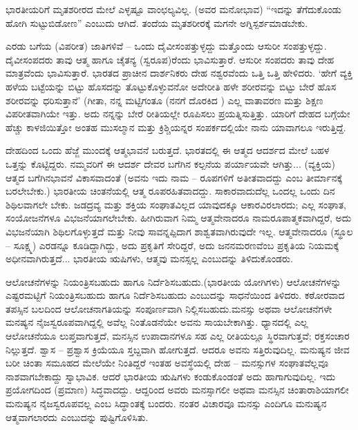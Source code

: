 ಭಾರತೀಯರಿಗೆ ಮೃತಶರೀರದ ಮೇಲೆ ಎಳ್ಳಷ್ಟೂ ವಾಂಛಲ್ಯವಿಲ್ಲ. (ಅವರ ಮನೋಭಾವ) “ಇದನ್ನು ತೆಗೆದುಕೊಂಡು ಹೋಗಿ ಸುಟ್ಟುಬಿಡೋಣ'' ಎಂಬುದು ಆಗಿದೆ. ತಂದೆಯ ಮೃತಶರೀರಕ್ಕೆ ಮಗನೇ ಅಗ್ನಿಸ್ಪರ್ಶಮಾಡಬೇಕು.

ಎರಡು ಬಗೆಯ (ವಿಪರೀತ) ಜಾತಿಗಳಿವೆ – ಒಂದು ದೈವೀಸಂಪತ್ತುಳ್ಳದ್ದು ಮತ್ತೊಂದು ಆಸುರೀ ಸಂಪತ್ತುಳ್ಳದ್ದು. ದೈವೀಸಂಪದರು ತಾವು ಆತ್ಮ ಹಾಗೂ ಚೈತನ್ಯ (ಸ್ವರೂಪ)ರೆಂದು ಭಾವಿಸುತ್ತಾರೆ. ಆಸುರೀ ಸಂಪದರು ತಾವು ದೇಹ ಮಾತ್ರವೆಂದು ಭಾವಿಸುತ್ತಾರೆ. ಭಾರತದ ಪ್ರಾಚೀನ ದಾರ್ಶನಿಕರು ದೇಹ ನಶ್ವರವೆಂದು ಒತ್ತಿ ಒತ್ತಿ ಹೇಳಿದರು. `ಹೇಗೆ ವ್ಯಕ್ತಿ ಹಳೆಯ ಬಟ್ಟೆಯನ್ನು ಬಿಟ್ಟು ಹೊಸದನ್ನು ತೊಟ್ಟುಕೊಳ್ಳುವನೋ ಅದೇರೀತಿ ಹಳೇ ಶರೀರವನ್ನು ಬಿಟ್ಟು ಬೇರೆ ಹೊಸ ಶರೀರವನ್ನು ಧರಿಸುತ್ತಾನೆ' (ಗೀತಾ,  ನನ್ನ ಮಟ್ಟಿಗಂತೂ (ನನಗೆ ದೊರಕಿದ ) ಎಲ್ಲ ವಾತಾವರಣ ಮತ್ತು ಶಿಕ್ಷಣ ವಿಪರೀತವಾಗಿಯೇ ಇತ್ತು. ಅದು ನನ್ನನ್ನು ಬೇರೆ ರೀತಿಯಲ್ಲೇ ರೂಪಿಸಲು ಪ್ರಯತ್ನಿಸುತ್ತಿತ್ತು. ಯಾರಿಗೆ ದೇಹದ ಬಗ್ಗೆಯೇ ಹೆಚ್ಚು ಕಾಳಜಿಯಿತ್ತೋ ಅಂತಹ ಮುಸಲ್ಮಾನ ಮತ್ತು ಕ್ರಿಶ್ಚಿಯನ್ನರ ಸಂಪರ್ಕದಲ್ಲಿಯೇ ನಾನು ಯಾವಾಗಲೂ ಇರುತ್ತಿದ್ದೆ.

ದೇಹದಿಂದ ಒಂದು ಹೆಜ್ಜೆ ಮುಂದಕ್ಕೆ ಆತ್ಮಭಾವನೆ ಬರುತ್ತದೆ. ಭಾರತದಲ್ಲಿ ಈ ಆತ್ಮದ ಆದರ್ಶದ ಮೇಲೆ ಬಹಳ ಒತ್ತನ್ನು ಕೊಟ್ಟಿದ್ದರು. ನಮ್ಮವರಿಗೆ ಈ ಆದರ್ಶ ದೇವರ ಬಗೆಗಿನ ಕಲ್ಪನೆಯ ಪರ್ಯಾಯವೇ ಆಗಿತ್ತು... (ವ್ಯಕ್ತಿಯ) ಆತ್ಮದ ಬಗೆಗಿನ\break ಭಾವನೆ ವಿಕಾಸವಾದಂತೆ (ಅವನು ಇದು ನಾಮ – ರೂಪಗಳಿಗೆ ಅತೀತವಾದದ್ದು ಎಂಬ ತೀರ್ಮಾನಕ್ಕೆ ಬರಲೇಬೇಕು.) ಭಾರತೀಯ ಚಿಂತನೆಯಲ್ಲಿ ಆತ್ಮ ರೂಪರಹಿತವಾದದ್ದು. ಸಾಕಾರವಾದುದೆಲ್ಲ ಒಂದಲ್ಲ ಒಂದು ದಿನ ಶಿಥಿಲವಾಗಲೇ ಬೇಕು. ಜಡದ್ರವ್ಯ ಮತ್ತು ಶಕ್ತಿಯ ಸಂಘಾತವಿಲ್ಲದ ಯಾವುದಕ್ಕೂ ಆಕಾರವಿರಲಾರದು; ಎಲ್ಲ ಸಂಘಾತ, ಸಂಯೋಜನೆಗಳೂ ವಿಭಜನೆಯಾಗಲೇಬೇಕು. ಹೀಗಿರುವಾಗ ನಿಮ್ಮ ಆತ್ಮವೇನಾದರೂ ನಾಮರೂಪಾತ್ಮಕವಾಗಿದ್ದರೆ, ಅದು ವಿಭಜನೆಯಾಗಿ ಶಿಥಿಲಗೊಳ್ಳುತ್ತದೆ ಮತ್ತು ನೀವು ಸಾವನ್ನಪ್ಪಿದಾಗ ಶಾಶ್ವತವಾಗಿರುವುದೇ ಇಲ್ಲ. ಆತ್ಮವೇನಾದರೂ (ಸ್ಥೂಲ – ಸೂಕ್ಷ್ಮ) ಎರಡನ್ನೂ ಕೂಡಿದ್ದಾಗಿದ್ದು, ಅದು ಪ್ರಕೃತಿಗೆ ಸೇರಿದ್ದರೆ, ಅದು ಜನನಮರಣವೆಂಬ ಪ್ರಕೃತಿಯ ನಿಯಮಕ್ಕೆ ಅಧೀನವಾಗಿರುತ್ತದೆ... ಭಾರತೀಯ ಋಷಿಗಳು, ಆತ್ಮವು ಮನಸ್ಸಲ್ಲ ಎಂಬುದನ್ನು ತಿಳಿದುಕೊಂಡರು.

ಆಲೋಚನೆಗಳನ್ನು ನಿಯಂತ್ರಿಸಬಹುದು ಹಾಗೂ ನಿರ್ದೆಶಿಸಬಹುದು.\break (ಭಾರತೀಯ ಯೋಗಿಗಳು) ಆಲೋಚನೆಗಳನ್ನು ಎಷ್ಟರಮಟ್ಟಿಗೆ ನಿಯಂತ್ರಿಸಬಹುದು ಹಾಗೂ ನಿರ್ದೆಶಿಸಬಹುದು ಎಂಬುದನ್ನು ಸಾಧನೆಯಿಂದ ತಿಳಿದರು. ಕಠೋರವಾದ ತಪಸ್ಸಿನ ಬಲದಿಂದ ಆಲೋಚನಾಗತಿಯನ್ನು ಸಂಪೂರ್ಣವಾಗಿ ನಿಲ್ಲಿಸಬಹುದು.\break ಮನಸ್ಸು ಅಥವಾ ಆಲೋಚನೆಗಳೇ ಮನಷ್ಯನ ನೈಜಸ್ವರೂಪವಾಗಿದ್ದಲ್ಲಿ ಅವೆಲ್ಲ ನಿಂತೊಡನೆಯೇ ಅವನು ಸಾಯಬೇಕಾಗಿತ್ತು. ಧ್ಯಾನದಲ್ಲಿ ಎಲ್ಲ ಆಲೋಚನೆಯೂ ಲುಪ್ತವಾಗುತ್ತದೆ, ಮನಸ್ಸಿನ ಉಪಾದಾನಗಳೂ ಸಹ ಎಲ್ಲ ರೀತಿಯಲ್ಲೂ ಸ್ಥಿರವಾಗುತ್ತವೆ; ರಕ್ತಸಂಚಾರ ನಿಲ್ಲುತ್ತದೆ. ಶ್ವಾಸ – ಪ್ರಶ್ವಾಸ ಕ್ರಿಯೆಯೂ ಸ್ತಬ್ದವಾಗಿ ಹೋಗುತ್ತದೆ. ಆದರೂ ಅವನು ಸತ್ತಿರುವುದಿಲ್ಲ. ಮನುಷ್ಯನ ಜೀವ ಬರೀ ಚಿಂತಾ ಸಮೂಹದ ಮೇಲೆಯೇ ನಿಂತಿದ್ದರೆ ಇಂತಹ ಅವಸ್ಥೆಯಲ್ಲಿ ದೇಹ – ಮನಸ್ಸುಗಳ ಸಂಘಾತವೆಲ್ಲವೂ ನಾಶವಾಗಬೇಕಾದ್ದು ಸ್ವಾಭಾವಿಕ. ಆದರೆ ಭಾರತೀಯ ಋಷಿಗಳು ಕಂಡುಕೊಂಡಂತೆ ಅದು ಹಾಗಾಗುವುದಿಲ್ಲ. ಇದು ಪ್ರಯೋಗದಿಂದ (ಪ್ರಮಾಣ) ಸಿದ್ಧವಾದದ್ದು. ಆದ್ದರಿಂದ ಅವರು ಮನಸ್ಸಾಗಲೀ ಅಥವಾ ಮನಸ್ಸಿನ ಚಿಂತಾರಾಶಿಯಾಗಲೀ ಮನುಷ್ಯನ ನೈಜಸ್ವರೂಪವಲ್ಲ ಎಂಬ ಸಿದ್ಧಾಂತಕ್ಕೆ ಬಂದರು. ನಂತರ ವಿಚಾರವೂ ಮನಸ್ಸು ಎಂದಿಗೂ ಮನುಷ್ಯನ ಆತ್ಮವಾಗಲಾರದು ಎಂಬುದನ್ನು ಪುಷ್ಟಿಗೊಳಿಸಿತು.

